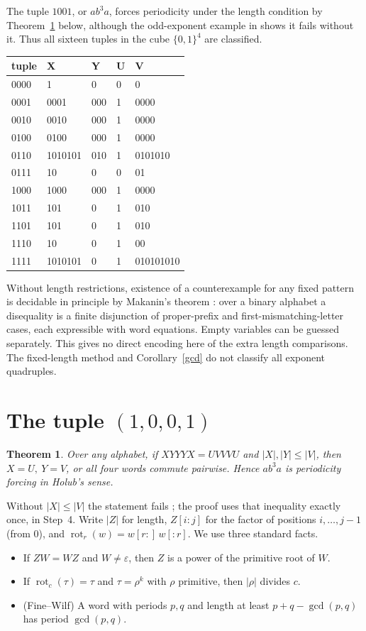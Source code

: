 \documentclass[10pt]{article}
\newtheorem{theorem}{Theorem}
\newcommand{\eps}{\varepsilon}
\theoremstyle{remark}\newtheorem*{remark}{Remark}
\begin{document}
The tuple \(1001\), or \(ab^3a\), forces periodicity under the length condition by Theorem~\ref{t1001} below, although the odd-exponent example in \cite[conclusion]{hh} shows it fails without it. Thus all sixteen tuples in the cube \(\{0,1\}^4\) are classified.
\begin{center}\small\ttfamily
\begin{tabular}{lllll}\toprule
tuple & X & Y & U & V\\\midrule
0000&1&0&0&0\\
0001&0001&000&1&0000\\
0010&0010&000&1&0000\\
0100&0100&000&1&0000\\
0110&1010101&010&1&0101010\\
0111&10&0&0&01\\
1000&1000&000&1&0000\\
1011&101&0&1&010\\
1101&101&0&1&010\\
1110&10&0&1&00\\
1111&1010101&0&1&010101010\\\bottomrule
\end{tabular}
\end{center}
Without length restrictions, existence of a counterexample for any fixed pattern is decidable in principle by Makanin's theorem \cite{mak}: over a binary alphabet a disequality is a finite disjunction of proper-prefix and first-mismatching-letter cases, each expressible with word equations. Empty variables can be guessed separately. This gives no direct encoding here of the extra length comparisons. The fixed-length method and Corollary~\ref{gcd} do not classify all exponent quadruples.

\section{The tuple \((1,0,0,1)\)}
\begin{theorem}\label{t1001}
Over any alphabet, if \(XYYYX=UVVVU\) and \(|X|,|Y|\le|V|\), then \(X=U,\ Y=V\), or all four words commute pairwise. Hence \(ab^3a\) is periodicity forcing in Holub's sense.
\end{theorem}
Without \(|X|\le|V|\) the statement fails \cite{hh}; the proof uses that inequality exactly once, in Step~4. Write \(|Z|\) for length, \(Z[i{:}j]\) for the factor of positions \(i,\dots,j-1\) (from \(0\)), and \(\operatorname{rot}_r(w)=w[r{:}]\,w[{:}r]\). We use three standard facts.
\begin{itemize}
\item[(F1)] If \(ZW=WZ\) and \(W\ne\eps\), then \(Z\) is a power of the primitive root of \(W\).
\item[(F2)] If \(\operatorname{rot}_c(\tau)=\tau\) and \(\tau=\rho^k\) with \(\rho\) primitive, then \(|\rho|\) divides \(c\).
\item[(F3)] (Fine--Wilf) A word with periods \(p,q\) and length at least \(p+q-\gcd(p,q)\) has period \(\gcd(p,q)\).
\end{itemize}
\end{document}
